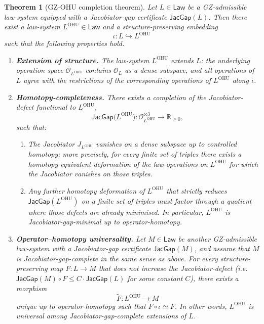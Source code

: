 \documentclass[11pt]{book}
\theoremstyle{plain}
\newtheorem{theorem}{Theorem}[chapter]      \newtheorem{proposition}[theorem]{Proposition} \newtheorem{lemma}[theorem]{Lemma}          \newtheorem{corollary}[theorem]{Corollary}
\theoremstyle{definition}
\begin{document}
\begin{theorem}[GZ-OHU completion theorem]
\label{thm:GZ-OHU}
Let \(L\in\mathsf{Law}\) be a GZ-admissible law-system equipped with a
Jacobiator-gap certificate \(\mathsf{JacGap}(L)\).  Then there exist a
law-system \(L^{\mathrm{OHU}}\in\mathsf{Law}\) and a structure-preserving
embedding
\[
  \iota : L\hookrightarrow L^{\mathrm{OHU}}
\]
such that the following properties hold.

\begin{enumerate}
  \item[\textnormal{(1)}] \textbf{Extension of structure.}
    The law-system \(L^{\mathrm{OHU}}\) extends \(L\): the underlying
    operation space \(\mathcal{O}_{L^{\mathrm{OHU}}}\) contains
    \(\mathcal{O}_L\) as a dense subspace, and all operations of \(L\)
    agree with the restrictions of the corresponding operations of
    \(L^{\mathrm{OHU}}\) along \(\iota\).

  \item[\textnormal{(2)}] \textbf{Homotopy-completeness.}
    There exists a completion of the Jacobiator-defect functional to
    \(L^{\mathrm{OHU}}\),
    \[
      \mathsf{JacGap}\bigl(L^{\mathrm{OHU}}\bigr)
      : \mathcal{O}_{L^{\mathrm{OHU}}}^{\otimes 3}\to\mathbb{R}_{\ge 0},
    \]
    such that:
    \begin{enumerate}
      \item[(a)] The Jacobiator \(J_{L^{\mathrm{OHU}}}\) vanishes on a
        dense subspace up to controlled homotopy; more precisely, for
        every finite set of triples there exists a homotopy-equivalent
        deformation of the law-operations on \(L^{\mathrm{OHU}}\) for
        which the Jacobiator vanishes on those triples.
      \item[(b)] Any further homotopy deformation of
        \(L^{\mathrm{OHU}}\) that strictly reduces
        \(\mathsf{JacGap}(L^{\mathrm{OHU}})\) on a finite set of
        triples must factor through a quotient where those defects are
        already minimised.  In particular, \(L^{\mathrm{OHU}}\) is
        Jacobiator-gap-minimal up to operator-homotopy.
    \end{enumerate}

  \item[\textnormal{(3)}] \textbf{Operator--homotopy universality.}
    Let \(M\in\mathsf{Law}\) be another GZ-admissible law-system with
    a Jacobiator-gap certificate \(\mathsf{JacGap}(M)\), and assume
    that \(M\) is Jacobiator-gap-complete in the same sense as above.
    For every structure-preserving map
    \(F : L\to M\) that does not increase the Jacobiator-defect
    (i.e.\ \(\mathsf{JacGap}(M)\circ F
    \le C\cdot\mathsf{JacGap}(L)\) for some constant \(C\)), there
    exists a morphism
    \[
      \widetilde{F} : L^{\mathrm{OHU}}\to M
    \]
    unique up to operator-homotopy such that \(\widetilde{F}\circ\iota
    \simeq F\).  In other words, \(L^{\mathrm{OHU}}\) is universal
    among Jacobiator-gap-complete extensions of \(L\).


\end{enumerate}
\end{theorem}
\end{document}
